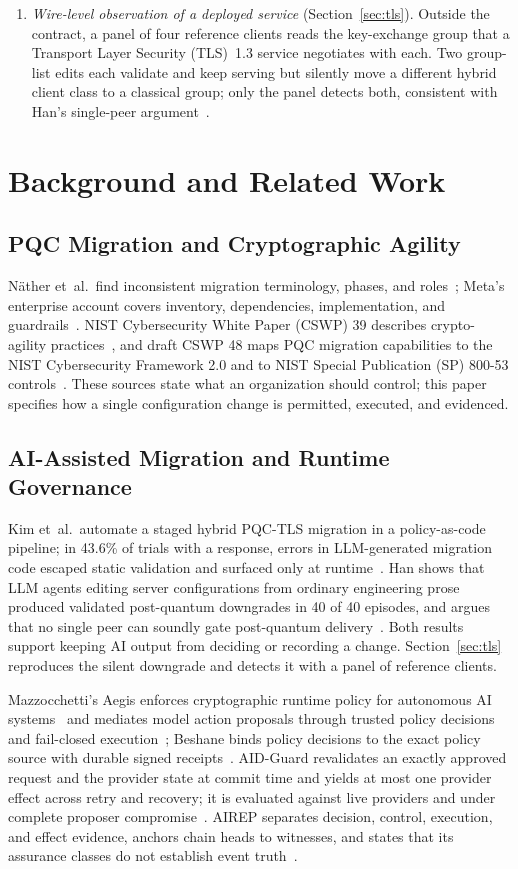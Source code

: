 \documentclass[journal]{IEEEtran}
\begin{document}
\begin{enumerate}
\item \emph{Wire-level observation of a deployed service} (Section~\ref{sec:tls}). Outside the contract, a panel of four reference clients reads the key-exchange group that a Transport Layer Security (TLS)~1.3 service negotiates with each. Two group-list edits each validate and keep serving but silently move a different hybrid client class to a classical group; only the panel detects both, consistent with Han's single-peer argument~\cite{han}.
\end{enumerate}

\section{Background and Related Work}
\label{sec:related}

\subsection{PQC Migration and Cryptographic Agility}
N\"ather et~al.\ find inconsistent migration terminology, phases, and roles~\cite{naether}; Meta's enterprise account covers inventory, dependencies, implementation, and guardrails~\cite{meta}. NIST Cybersecurity White Paper (CSWP) 39 describes crypto-agility practices~\cite{cswp39}, and draft CSWP 48 maps PQC migration capabilities to the NIST Cybersecurity Framework 2.0 and to NIST Special Publication (SP) 800-53 controls~\cite{cswp48}. These sources state what an organization should control; this paper specifies how a single configuration change is permitted, executed, and evidenced.

\subsection{AI-Assisted Migration and Runtime Governance}
Kim et~al.\ automate a staged hybrid PQC-TLS migration in a policy-as-code pipeline; in 43.6\% of trials with a response, errors in LLM-generated migration code escaped static validation and surfaced only at runtime~\cite{kimpqc}. Han shows that LLM agents editing server configurations from ordinary engineering prose produced validated post-quantum downgrades in 40 of 40 episodes, and argues that no single peer can soundly gate post-quantum delivery~\cite{han}. Both results support keeping AI output from deciding or recording a change. Section~\ref{sec:tls} reproduces the silent downgrade and detects it with a panel of reference clients.

Mazzocchetti's Aegis enforces cryptographic runtime policy for autonomous AI systems~\cite{aegis} and mediates model action proposals through trusted policy decisions and fail-closed execution~\cite{mazz2}; Beshane binds policy decisions to the exact policy source with durable signed receipts~\cite{beshane}. AID-Guard revalidates an exactly approved request and the provider state at commit time and yields at most one provider effect across retry and recovery; it is evaluated against live providers and under complete proposer compromise~\cite{aidguard}. AIREP separates decision, control, execution, and effect evidence, anchors chain heads to witnesses, and states that its assurance classes do not establish event truth~\cite{airep}.
\end{document}
